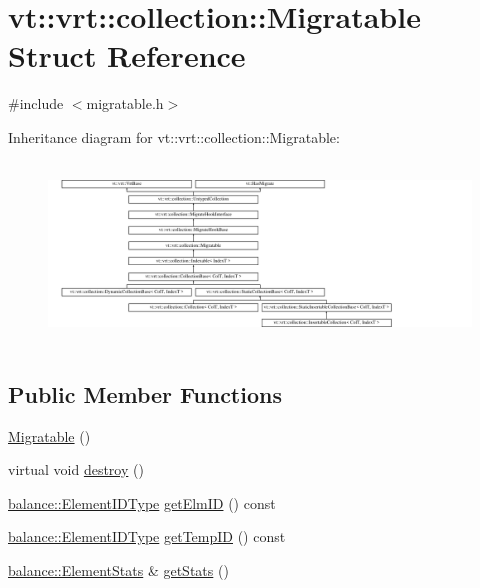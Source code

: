 \hypertarget{structvt_1_1vrt_1_1collection_1_1_migratable}{}\section{vt\+:\+:vrt\+:\+:collection\+:\+:Migratable Struct Reference}
\label{structvt_1_1vrt_1_1collection_1_1_migratable}


{\ttfamily \#include $<$migratable.\+h$>$}

Inheritance diagram for vt\+:\+:vrt\+:\+:collection\+:\+:Migratable\+:\begin{figure}[H]
\begin{center}
\leavevmode
\includegraphics[height=4.873803cm]{structvt_1_1vrt_1_1collection_1_1_migratable}
\end{center}
\end{figure}
\subsection*{Public Member Functions}
\begin{DoxyCompactItemize}
\item 
\hyperlink{structvt_1_1vrt_1_1collection_1_1_migratable_a598f0bb3acfb602d437eab3625b105c5}{Migratable} ()
\item 
virtual void \hyperlink{structvt_1_1vrt_1_1collection_1_1_migratable_a31effa8f54013d1a1794cd025c24e410}{destroy} ()
\item 
\hyperlink{namespacevt_1_1vrt_1_1collection_1_1balance_a14c8d2c972f2913aa3f1636e5be0a120}{balance\+::\+Element\+I\+D\+Type} \hyperlink{structvt_1_1vrt_1_1collection_1_1_migratable_a05b1ac1b0b5adc3f25e7126508d42153}{get\+Elm\+ID} () const
\item 
\hyperlink{namespacevt_1_1vrt_1_1collection_1_1balance_a14c8d2c972f2913aa3f1636e5be0a120}{balance\+::\+Element\+I\+D\+Type} \hyperlink{structvt_1_1vrt_1_1collection_1_1_migratable_aa6310afe23ea27f231dd486acedfdaec}{get\+Temp\+ID} () const
\item 
\hyperlink{structvt_1_1vrt_1_1collection_1_1balance_1_1_element_stats}{balance\+::\+Element\+Stats} \& \hyperlink{structvt_1_1vrt_1_1collection_1_1_migratable_a1e4863b384ac80b0b7c0b147c68256df}{get\+Stats} ()
\end{DoxyCompactItemize}
